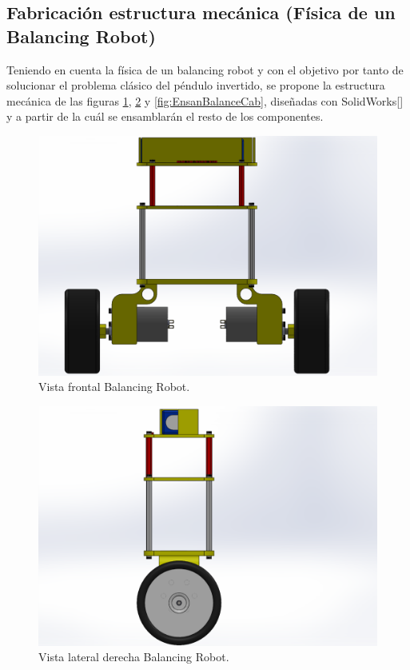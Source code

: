 \subsection{Fabricación estructura mecánica (Física de un Balancing Robot)}
Teniendo en cuenta la física de un balancing robot y con el objetivo por tanto de solucionar el problema clásico del péndulo invertido, se propone la estructura mecánica de las figuras \ref{fig:EnsanBalanceFront}, \ref{fig:EnsanBalanceLateral} y \ref{fig:EnsanBalanceCab}, diseñadas con SolidWorks[] y a partir de la cuál se ensamblarán el resto de los componentes.

\begin{center}
	\begin{figure}[H]
		\center
		\includegraphics[trim = 1cm 0mm 2.7cm 0mm,clip, angle=0, scale = 0.4]{imagenes/Balancing_Robot/EnsanBalanceFront.PDF}
		\caption{Vista frontal Balancing Robot.}
		\label{fig:EnsanBalanceFront}
	\end{figure}
\end{center}

\begin{center}
	\begin{figure}[H]
		\center
		\includegraphics[trim = 5cm 0mm 10cm 0mm,clip, angle=0, scale = 0.5]{imagenes/Balancing_Robot/EnsanBalanceLateral.PDF}
		\caption{Vista lateral derecha Balancing Robot.}
		\label{fig:EnsanBalanceLateral}
	\end{figure}
\end{center}

